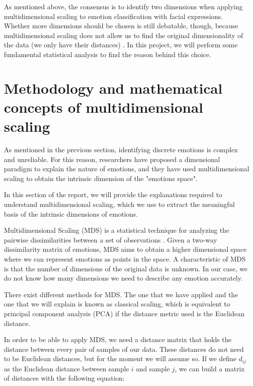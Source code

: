 \documentclass[11pt, a4paper]{article}
\numberwithin{equation}{subsection}
\begin{document}
As mentioned above, the consensus is to identify two dimensions when applying multidimensional scaling to emotion classification with facial expressions. Whether more dimensions should be chosen is still debatable, though, because multidimensional scaling does not allow us to find the original dimensionality of the data (we only have their distances) \cite{izenman2008modern}. In this project, we will perform some fundamental statistical analysis to find the reason behind this choice.


\section{Methodology and mathematical concepts of multidimensional scaling}\label{sect:mds_explanation}

As mentioned in the previous section, identifying discrete emotions is complex and unreliable. For this reason, researchers have proposed a dimensional paradigm to explain the nature of emotions, and they have used multidimensional scaling to obtain the intrinsic dimension of the "emotions space".

In this section of the report, we will provide the explanations required to understand multidimensional scaling, which we use to extract the meaningful basis of the intrinsic dimensions of emotions.

Multidimensional Scaling (MDS) is a statistical technique for analyzing the pairwise dissimilarities between a set of observations \cite{izenman2008modern}. Given a two-way dissimilarity matrix of emotions, MDS aims to obtain a higher dimensional space where we can represent emotions as points in the space. A characteristic of MDS is that the number of dimensions of the original data is unknown. In our case, we do not know how many dimensions we need to describe any emotion accurately.

There exist different methods for MDS. The one that we have applied and the one that we will explain is known as classical scaling, which is equivalent to principal component analysis (PCA) if the distance metric used is the Euclidean distance.

In order to be able to apply MDS, we need a distance matrix that holds the distance between every pair of samples of our data. These distances do not need to be Euclidean distances, but for the moment we will assume so. If we define $d_{ij}$ as the Euclidean distance between sample $i$ and sample $j$, we can build a matrix of distances with the following equation:
\end{document}
